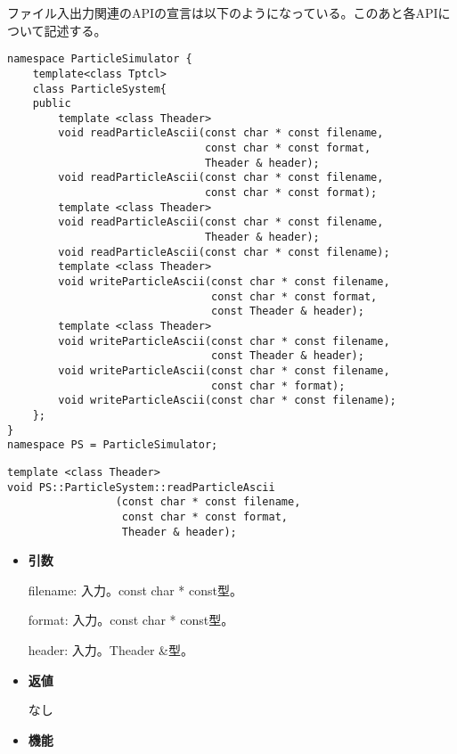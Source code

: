 ファイル入出力関連のAPIの宣言は以下のようになっている。このあと各APIに
ついて記述する。
\begin{lstlisting}[caption=ParticleSystem3]
namespace ParticleSimulator {
    template<class Tptcl>
    class ParticleSystem{
    public
        template <class Theader>
        void readParticleAscii(const char * const filename,
                               const char * const format,
                               Theader & header);
        void readParticleAscii(const char * const filename,       
                               const char * const format);
        template <class Theader>
        void readParticleAscii(const char * const filename,
                               Theader & header);
        void readParticleAscii(const char * const filename);        
        template <class Theader>
        void writeParticleAscii(const char * const filename,
                                const char * const format,
                                const Theader & header);        
        template <class Theader>
        void writeParticleAscii(const char * const filename,
                                const Theader & header);
        void writeParticleAscii(const char * const filename,
                                const char * format);                                       
        void writeParticleAscii(const char * const filename);
    };
}
namespace PS = ParticleSimulator;
\end{lstlisting}


\label{sec:readParticleAscii}

\begin{screen}
\begin{verbatim}
template <class Theader>
void PS::ParticleSystem::readParticleAscii
                 (const char * const filename,
                  const char * const format,
                  Theader & header);
\end{verbatim}
\end{screen}

\begin{itemize}

\item {\bf 引数}

filename: 入力。const char * const型。

format: 入力。const char * const型。

header: 入力。Theader \&型。

\item {\bf 返値}

なし

\item {\bf 機能}


\end{itemize}

